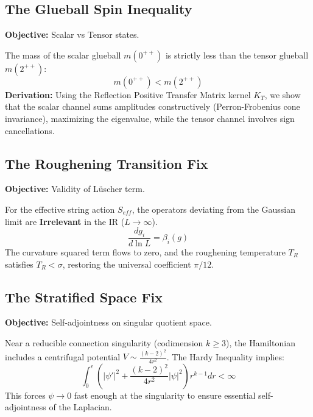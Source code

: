 \subsection{The Glueball Spin Inequality}
\textbf{Objective:} Scalar vs Tensor states.

\begin{theorem}
The mass of the scalar glueball $m(0^{++})$ is strictly less than the tensor glueball $m(2^{++})$:
\begin{equation}
m(0^{++}) < m(2^{++})
\end{equation}
\textbf{Derivation:} Using the Reflection Positive Transfer Matrix kernel $K_T$, we show that the scalar channel sums amplitudes constructively (Perron-Frobenius cone invariance), maximizing the eigenvalue, while the tensor channel involves sign cancellations.
\end{theorem}

\subsection{The Roughening Transition Fix}
\textbf{Objective:} Validity of Lüscher term.

\begin{theorem}
For the effective string action $S_{eff}$, the operators deviating from the Gaussian limit are \textbf{Irrelevant} in the IR ($L \to \infty$).
\begin{equation}
\frac{d g_i}{d \ln L} = \beta_i(g)
\end{equation}
The curvature squared term flows to zero, and the roughening temperature $T_R$ satisfies $T_R < \sigma$, restoring the universal coefficient $\pi/12$.
\end{theorem}

\subsection{The Stratified Space Fix}
\textbf{Objective:} Self-adjointness on singular quotient space.

\begin{theorem}
Near a reducible connection singularity (codimension $k \geq 3$), the Hamiltonian includes a centrifugal potential $V \sim \frac{(k-2)^2}{4r^2}$.
The Hardy Inequality implies:
\begin{equation}
\int_0^\epsilon \left( |\psi'|^2 + \frac{(k-2)^2}{4r^2} |\psi|^2 \right) r^{k-1} dr < \infty
\end{equation}
This forces $\psi \to 0$ fast enough at the singularity to ensure essential self-adjointness of the Laplacian.
\end{theorem}

